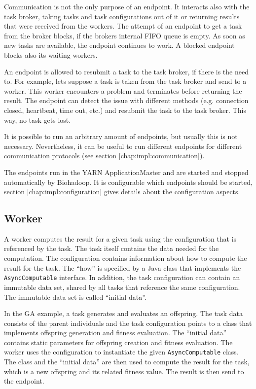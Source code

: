 Communication is not the only purpose of an endpoint. It interacts also with the task broker, taking tasks and task configurations out of it or returning results that were received from the workers. The attempt of an endpoint to get a task from the broker blocks, if the brokers internal FIFO queue is empty. As soon as new tasks are available, the endpoint continues to work. A blocked endpoint blocks also its waiting workers.

An endpoint is allowed to resubmit a task to the task broker, if there is the need to. For example, lets suppose a task is taken from the task broker and send to a worker. This worker encounters a problem and terminates before returning the result. The endpoint can detect the issue with different methods (e.g. connection closed, heartbeat, time out, etc.) and resubmit the task to the task broker. This way, no task gets lost.

It is possible to run an arbitrary amount of endpoints, but usually this is not necessary. Nevertheless, it can be useful to run different endpoints for different communication protocols (see section \ref{chap:impl:communication}).

The endpoints run in the YARN ApplicationMaster and are started and stopped automatically by Biohadoop. It is configurable which endpoints should be started, section \ref{chap:impl:configuration} gives details about the configuration aspects.

\subsection{Worker}
\label{chap:impl:worker}
A worker computes the result for a given task using the configuration that is referenced by the task. The task itself contains the data needed for the computation. The configuration contains information about how to compute the result for the task. The ``how'' is specified by a Java class that implements the \texttt{AsyncComputable} interface. In addition, the task configuration can contain an immutable data set, shared by all tasks that reference the same configuration. The immutable data set is called  ``initial data''.

In the GA example, a task generates and evaluates an offspring. The task data consists of the parent individuals and the task configuration points to a class that implements offspring generation and fitness evaluation. The ``initial data'' contains static parameters for offspring creation and fitness evaluation. The worker uses the configuration to instantiate the given \texttt{AsyncComputable} class. The class and the ``initial data'' are then used to compute the result for the task, which is a new offspring and its related fitness value. The result is then send to the endpoint.

